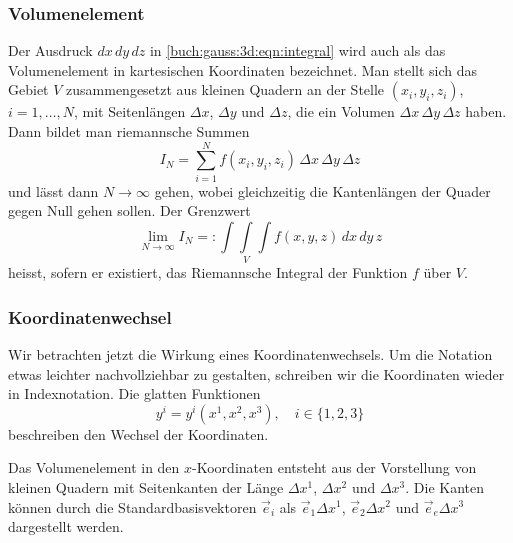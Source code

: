 %
%
\subsubsection{Volumenelement}
Der Ausdruck $dx\,dy\,dz$ in \eqref{buch:gauss:3d:eqn:integral}
wird auch als das Volumenelement in kartesischen Koordinaten bezeichnet.
Man stellt sich das Gebiet $V$ zusammengesetzt aus kleinen Quadern
an der Stelle $(x_i,y_i,z_i)$, $i=1,\dots,N$,
mit Seitenlängen $\Delta x$, $\Delta y$ und $\Delta z$, die ein
Volumen $\Delta x\,\Delta y\,\Delta z$ haben.
Dann bildet man riemannsche Summen
\[
I_N
=
\sum_{i=1}^N
f(x_i,y_i,z_i)\,\Delta x\,\Delta y\,\Delta z
\]
und lässt dann $N\to\infty$ gehen, wobei gleichzeitig die Kantenlängen
der Quader gegen Null gehen sollen.
Der Grenzwert
\[
\lim_{N\to\infty} I_N
=:
\underset{V}{\int\!\!\!\int\!\!\!\int}
f(x,y,z)\,dx\,dy\,z
\]
heisst, sofern er existiert, das Riemannsche Integral der Funktion $f$
über $V$.

%
%
\subsubsection{Koordinatenwechsel}
Wir betrachten jetzt die Wirkung eines Koordinatenwechsels.
Um die Notation etwas leichter nachvollziehbar zu gestalten, schreiben
wir die Koordinaten wieder in Indexnotation.
Die glatten Funktionen
\begin{equation}
y^i
=
y^i(x^1,x^2,x^3),\quad i\in\{1,2,3\}
\label{buch:gauss:3d:eqn:koordinatenabbildung}
\end{equation}
beschreiben den Wechsel der Koordinaten.

Das Volumenelement in den $x$-Koordinaten entsteht aus der Vorstellung
von kleinen Quadern mit Seitenkanten der Länge
$\Delta x^1$, 
$\Delta x^2$ und
$\Delta x^3$.
Die Kanten können durch die Standardbasisvektoren $\vec{e}_i$ als
$\vec{e}_1\Delta x^1$, $\vec{e}_2\Delta x^2$ und $\vec{e}_e\Delta x^3$
dargestellt werden.

